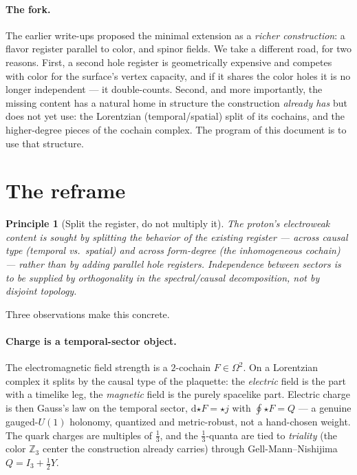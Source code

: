 \documentclass[11pt]{article}
\newtheorem{principle}{Principle}
\theoremstyle{definition}
\newcommand{\Z}{\mathbb{Z}}
\newcommand{\dd}{\mathrm{d}}
\begin{document}
\paragraph{The fork.} The earlier write-ups proposed the minimal extension as a
\emph{richer construction}: a flavor register parallel to color, and spinor fields. We
take a different road, for two reasons. First, a second hole register is geometrically
expensive and competes with color for the surface's vertex capacity, and if it shares
the color holes it is no longer independent --- it double-counts. Second, and more
importantly, the missing content has a natural home in structure the construction
\emph{already has} but does not yet use: the Lorentzian (temporal/spatial) split of its
cochains, and the higher-degree pieces of the cochain complex. The program of this
document is to use that structure.

\section{The reframe}
\label{sec:reframe}

\begin{principle}[Split the register, do not multiply it]
\label{prin:split}
The proton's electroweak content is sought by splitting the behavior of the
\emph{existing} register --- across causal type (temporal vs.\ spatial) and across
form-degree (the inhomogeneous cochain) --- rather than by adding parallel hole
registers. Independence between sectors is to be supplied by orthogonality in the
spectral/causal decomposition, not by disjoint topology.
\end{principle}

Three observations make this concrete.

\paragraph{Charge is a temporal-sector object.} The electromagnetic field strength is a
$2$-cochain $F\in\Omega^2$. On a Lorentzian complex it splits by the causal type of the
plaquette: the \emph{electric} field is the part with a timelike leg, the \emph{magnetic}
field is the purely spacelike part. Electric charge is then Gauss's law on the temporal
sector, $\dd{\star F}=\star j$ with $\oint \star F = Q$ --- a genuine gauged-$U(1)$
holonomy, quantized and metric-robust, not a hand-chosen weight. The quark charges are
multiples of $\tfrac13$, and the $\tfrac13$-quanta are tied to \emph{triality} (the
color $\Z_3$ center the construction already carries) through Gell-Mann--Nishijima
$Q=I_3+\tfrac12 Y$.
\end{document}
